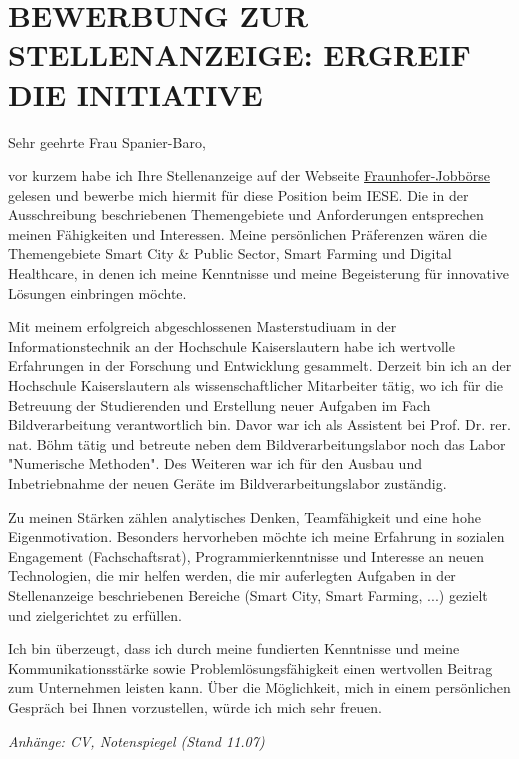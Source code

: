\documentclass[a4paper]{article}
\author{Yves Seburger}
\date{Kaiserslautern, der 11.07.2024}{I}
\begin{document}
\maketitle

\section{\Large{BEWERBUNG ZUR STELLENANZEIGE: ERGREIF DIE INITIATIVE}}

Sehr geehrte Frau Spanier-Baro,

vor kurzem habe ich Ihre Stellenanzeige auf der Webseite 
\href{https://jobs.fraunhofer.de/job/Kaiserslautern-ERGREIF-DIE-INITIATIVE-67663/766448001/}{Fraunhofer-Jobbörse}
gelesen und bewerbe mich hiermit für diese Position beim IESE.
Die in der Ausschreibung beschriebenen Themengebiete und Anforderungen entsprechen 
meinen Fähigkeiten und Interessen. Meine persönlichen Präferenzen wären die Themengebiete
Smart City \& Public Sector, Smart Farming und Digital Healthcare, 
in denen ich meine Kenntnisse und meine Begeisterung für innovative Lösungen einbringen möchte.

Mit meinem erfolgreich abgeschlossenen Masterstudiuam in der Informationstechnik an 
der Hochschule Kaiserslautern habe ich wertvolle Erfahrungen in der Forschung 
und Entwicklung gesammelt. Derzeit bin ich an der Hochschule Kaiserslautern 
als wissenschaftlicher Mitarbeiter tätig, wo ich für die Betreuung der 
Studierenden und Erstellung neuer Aufgaben im Fach Bildverarbeitung 
verantwortlich bin. Davor war ich als Assistent bei Prof. Dr. rer. nat. Böhm 
tätig und betreute neben dem Bildverarbeitungslabor noch
das Labor "Numerische Methoden". Des Weiteren war ich für den Ausbau und 
Inbetriebnahme der neuen Geräte im Bildverarbeitungslabor zuständig.

Zu meinen Stärken zählen analytisches Denken, Teamfähigkeit und eine hohe 
Eigenmotivation. Besonders hervorheben möchte ich meine Erfahrung in 
sozialen Engagement (Fachschaftsrat), Programmierkenntnisse und Interesse 
an neuen Technologien, die mir helfen werden, die mir auferlegten Aufgaben 
in der Stellenanzeige beschriebenen Bereiche (Smart City, Smart Farming, ...) 
gezielt und zielgerichtet zu erfüllen.

Ich bin überzeugt, dass ich durch meine fundierten Kenntnisse und meine 
Kommunikationsstärke sowie Problemlösungsfähigkeit einen wertvollen Beitrag 
zum Unternehmen leisten kann. Über die Möglichkeit, mich in einem persönlichen 
Gespräch bei Ihnen vorzustellen, würde ich mich sehr freuen.

\par
\dotline
\vspace{\baselineskip}
\textit{Anhänge: CV, Notenspiegel (Stand 11.07)}
\par

\end{document}
